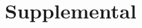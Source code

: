 \section{Supplemental}
\vfill

\setcounter{figure}{0}
\renewcommand{\thefigure}{S\arabic{figure}}
\setcounter{table}{0}
\renewcommand{\thetable}{S\arabic{table}}
